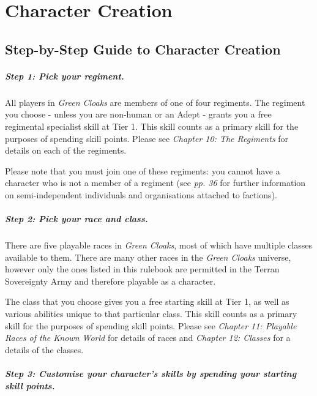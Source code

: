 \part{Character Creation}

\chapter{Step-by-Step Guide to Character Creation}

\subsubsection{Step 1: Pick your regiment.}

All players in \textit{Green Cloaks} are members of one of four regiments. The regiment you choose - unless you are non-human or an Adept - grants you a free regimental specialist skill at Tier 1. This skill counts as a primary skill for the purposes of spending skill points. Please see \textit{Chapter 10: The Regiments} for details on each of the regiments.

Please note that you must join one of these regiments: you cannot have a character who is not a member of a regiment (see \textit{pp. 36} for further information on semi-independent individuals and organisations attached to factions).

\subsubsection{Step 2: Pick your race and class.}

There are five playable races in \textit{Green Cloaks}, most of which have multiple classes available to them. There are many other races in the \textit{Green Cloaks} universe, however only the ones listed in this rulebook are permitted in the Terran Sovereignty Army and therefore playable as a character.

The class that you choose gives you a free starting skill at Tier 1, as well as various abilities unique to that particular class. This skill counts as a primary skill for the purposes of spending skill points. Please see \textit{Chapter 11: Playable Races of the Known World} for details of races and \textit{Chapter 12: Classes} for a details of the classes.

\subsubsection{Step 3: Customise your character's skills by spending your starting skill points.}

